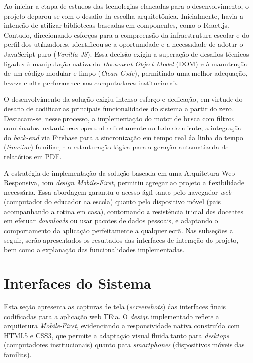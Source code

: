 Ao iniciar a etapa de estudos das tecnologias elencadas para o desenvolvimento, o projeto deparou-se com o desafio da escolha arquitetônica. Inicialmente, havia a intenção de utilizar bibliotecas baseadas em componentes, como o React.js. Contudo, direcionando esforços para a compreensão da infraestrutura escolar e do perfil dos utilizadores, identificou-se a oportunidade e a necessidade de adotar o JavaScript puro (\textit{Vanilla JS}). Essa decisão exigiu a superação de desafios técnicos ligados à manipulação nativa do \textit{Document Object Model} (DOM) e à manutenção de um código modular e limpo (\textit{Clean Code}), permitindo uma melhor adequação, leveza e alta performance nos computadores institucionais.

O desenvolvimento da solução exigiu intenso esforço e dedicação, em virtude do desafio de codificar as principais funcionalidades do sistema a partir do zero. Destacam-se, nesse processo, a implementação do motor de busca com filtros combinados instantâneos operando diretamente no lado do cliente, a integração do \textit{back-end} via Firebase para a sincronização em tempo real da linha do tempo (\textit{timeline}) familiar, e a estruturação lógica para a geração automatizada de relatórios em PDF.

A estratégia de implementação da solução baseada em uma Arquitetura Web Responsiva, com \textit{design Mobile-First}, permitiu agregar ao projeto a flexibilidade necessária. Essa abordagem garantiu o acesso ágil tanto pelo navegador \textit{web} (computador do educador na escola) quanto pelo dispositivo móvel (pais acompanhando a rotina em casa), contornando a resistência inicial dos docentes em efetuar \textit{downloads} ou usar pacotes de dados pessoais, e adaptando o comportamento da aplicação perfeitamente a qualquer ecrã. Nas subseções a seguir, serão apresentados os resultados das interfaces de interação do projeto, bem como a explanação das funcionalidades implementadas.

\vspace{0.5cm}
\section{Interfaces do Sistema}

Esta seção apresenta as capturas de tela (\textit{screenshots}) das interfaces finais codificadas para a aplicação web TEia. O \textit{design} implementado reflete a arquitetura \textit{Mobile-First}, evidenciando a responsividade nativa construída com HTML5 e CSS3, que permite a adaptação visual fluida tanto para \textit{desktops} (computadores institucionais) quanto para \textit{smartphones} (dispositivos móveis das famílias).

